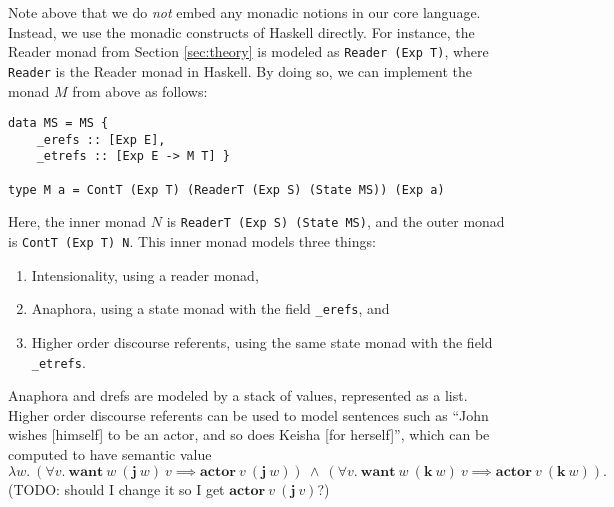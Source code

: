 \documentclass{article}
\begin{document}
Note above that we do \emph{not} embed any monadic notions in our core language. Instead, we use the monadic constructs of Haskell directly. For instance, the Reader monad from Section \ref{sec:theory} is modeled as \verb|Reader (Exp T)|, where \verb|Reader| is the Reader monad in Haskell. By doing so, we can implement the monad $M$ from above as follows:

\begin{lstlisting}
data MS = MS {
    _erefs :: [Exp E],
    _etrefs :: [Exp E -> M T] }

type M a = ContT (Exp T) (ReaderT (Exp S) (State MS)) (Exp a)
\end{lstlisting}

Here, the inner monad $N$ is \verb|ReaderT (Exp S) (State MS)|, and the outer monad is \verb|ContT (Exp T) N|. This inner monad models three things:
\begin{enumerate}
    \item Intensionality, using a reader monad,
    \item Anaphora, using a state monad with the field \verb|_erefs|, and
    \item Higher order discourse referents, using the same state monad with the field \verb|_etrefs|.
\end{enumerate}

Anaphora and drefs are modeled by a stack of values, represented as a list. Higher order discourse referents can be used to model sentences such as ``John wishes [himself] to be an actor, and so does Keisha [for herself]'', which can be computed to have semantic value
$$ \lambda w.\ (\forall v.\ \mathbf{want}\ w\ (\mathbf{j}\ w)\ v \implies \mathbf{actor}\ v\ (\textbf{j}\ w))\ \wedge\ 
               (\forall v.\ \mathbf{want}\ w\ (\mathbf{k}\ w)\ v \implies \mathbf{actor}\ v\ (\textbf{k}\ w)). $$
(TODO: should I change it so I get $\mathbf{actor}\ v\ (\textbf{j}\ v)$?)
               






\end{document}

